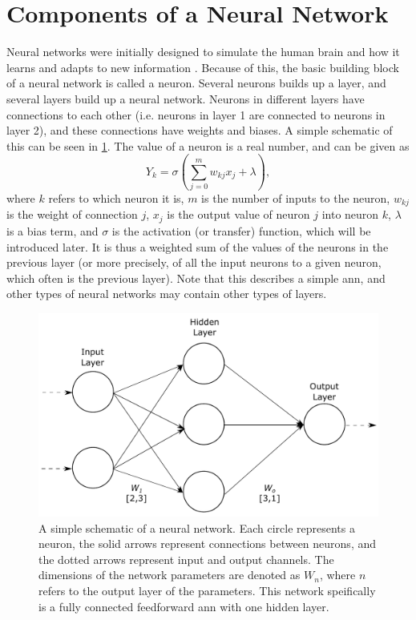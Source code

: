 \section{Components of a Neural Network}
Neural networks were initially designed to simulate the human brain and how it learns and adapts to new information \cite{McCulloch1943}. Because of this, the basic building block of a neural network is called a neuron. Several neurons builds up a layer, and several layers build up a neural network. Neurons in different layers have connections to each other (i.e. neurons in layer 1 are connected to neurons in layer 2), and these connections have weights and biases. A simple schematic of this can be seen in \cref{fig:neuralnetwork}. The value of a neuron is a real number, and can be given as \cite[81]{Wang2003}
\begin{equation}
    \label{eq:neuron}
    Y_{k} = \sigma\left(\sum_{j=0}^{m}w_{kj}x_j + \lambda \right),
\end{equation}
where $k$ refers to which neuron it is, $m$ is the number of inputs to the neuron, $w_{kj}$ is the weight of connection $j$, $x_j$ is the output value of neuron $j$ into neuron $k$, $\lambda$ is a bias term, and $\sigma$ is the activation (or transfer) function, which will be introduced later. It is thus a weighted sum of the values of the neurons in the previous layer (or more precisely, of all the input neurons to a given neuron, which often is the previous layer). Note that this describes a simple \acrfull{ann}, and other types of neural networks may contain other types of layers. 

\begin{figure}[htbp]  
    \centering
    \includegraphics[width=.8\textwidth]{figures/neuralnetwork.pdf}
    \caption[Neural network example]{A simple schematic of a neural network. Each circle represents a neuron, the solid arrows represent connections between neurons, and the dotted arrows represent input and output channels. The dimensions of the network parameters are denoted as $W_n$, where $n$ refers to the output layer of the parameters. This network speifically is a fully connected feedforward \acrlong{ann} with one hidden layer. }
    \label{fig:neuralnetwork}
\end{figure}

